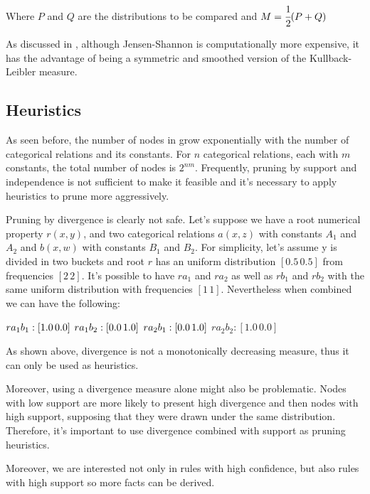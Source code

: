 Where $P$ and $Q$ are the distributions to be compared and $M=\cfrac{1}{2}(P+Q)$

As discussed in \cite{17795}, although Jensen-Shannon is computationally more expensive, it has the advantage of being a
symmetric and smoothed version of the Kullback-Leibler measure.


\subsection{Heuristics}

As seen before, the number of nodes in \graphname grow exponentially with the number of categorical relations
and its constants. For $n$ categorical relations, each with $m$ constants, the total number of nodes is $2^{nm}$.
Frequently, pruning by support and independence is not sufficient to make it feasible and it's necessary to apply
heuristics to prune more aggressively.


Pruning by divergence is clearly not safe. Let's suppose we have a root numerical property $r(x,y)$, and two categorical
relations $a(x,z)$ with constants $A_1$ and $A_2$ and $b(x,w)$ with constants $B_1$ and $B_2$. For simplicity, let's
assume y is divided in two buckets and root $r$ has an uniform distribution $[0.5 \, 0.5]$ from frequencies $[2 \, 2]$.
It's possible to have $r a_1$ and $r a_2$ as well as $r b_1$ and $r b_2$ with the same uniform distribution with
frequencies $[1 \, 1]$. Nevertheless when combined we can have the following:

$r a_1 b_1 : [1.0 \, 0.0] \\$
$r a_1 b_2 : [0.0 \, 1.0] \\$
$r a_2 b_1 : [0.0 \, 1.0] \\$
$r a_2 b_2 : [1.0 \, 0.0]$

As shown above, divergence is not a monotonically decreasing measure, thus it can only be used as heuristics.


Moreover, using a divergence measure alone might also be problematic. Nodes with low support are more likely to
present high divergence and then nodes with high support, supposing that they were drawn under the same distribution.
Therefore, it's important to use divergence combined with support as pruning heuristics.

Moreover, we are interested not only in rules with high confidence, but also rules with high support so more facts can
be derived.

